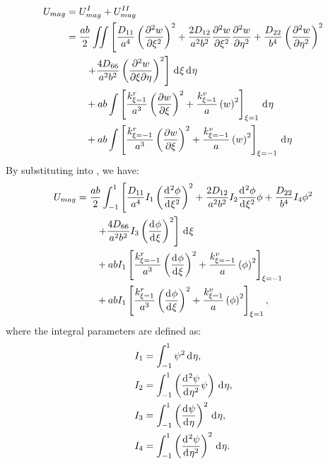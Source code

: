 \documentclass[preprint,12pt]{elsarticle}
\newcommand{\id}{\mathrm{d}\mkern1mu}
\begin{document}
%
\begin{equation}\label{eq:poten_energy_tolx}
	\begin{split}
		U_{mag} &= U^{I}_{mag} + U^{II}_{mag} \\
		&= \frac{ab}{2} \iint \left[ \frac{D_{11}}{a^4} \left( \frac{\partial^2 w}{\partial \xi^2} \right)^2 + \frac{2 D_{12}}{a^2 b^2} \frac{\partial^2 w}{\partial \xi^2} \frac{\partial^2 w}{\partial \eta^2} + \frac{D_{22}}{b^4} \left( \frac{\partial^2 w}{\partial \eta^2} \right)^2 \right. \\
		&\qquad \left.  + \frac{4 D_{66}}{a^2 b^2} \left( \frac{\partial^2 w}{\partial \xi \partial \eta} \right)^2 \right] \, \id\xi \, \id\eta \\
		&\qquad + ab \int \left[\frac{k^r_{\xi=1}}{a^3} \left( \frac{\partial w}{\partial \xi} \right)^2 + \frac{k^v_{\xi=1}}{a} \left( w \right)^2 \right]_{\xi=1} \, \id \eta \\
		&\qquad + ab \int \left[\frac{k^r_{\xi=-1}}{a^3} \left( \frac{\partial w}{\partial \xi} \right)^2 + \frac{k^v_{\xi=-1}}{a} \left( w \right)^2 \right]_{\xi=-1} \, \id \eta
	\end{split}
\end{equation}
%
By substituting  into , we have:
%
\begin{equation}\label{eq:poten_energy_tolx2}
	\begin{split}
		U_{mag}&=\frac{ab}{2} \int_{-1}^{1} \left[ \frac{D_{11}}{a^4}I_1 \left( \frac{\id^2\phi }{\id \xi^2} \right)^2 + \frac{2 D_{12}}{a^2 b^2}I_2 \frac{\id^2\phi }{\id \xi^2}\phi  + \frac{D_{22}}{b^4}I_4  \phi^2 \right. \\
		&\qquad \left. + \frac{4 D_{66}}{a^2 b^2}I_3 \left( \frac{\id \phi }{\id \xi}\right)^2 \right] \, \id\xi \\
		&\qquad + abI_1 \left[\frac{k^r_{\xi=-1}}{a^3} \left( \frac{\id \phi}{\id \xi} \right)^2+ \frac{k^v_{\xi=-1}}{a} \left( \phi \right)^2\right]_{\xi=-1}\\
		&\qquad + abI_1 \left[\frac{k^r_{\xi=1}}{a^3} \left( \frac{\id \phi}{\id \xi} \right)^2+ \frac{k^v_{\xi=1}}{a} \left( \phi \right)^2\right]_{\xi=1},
	\end{split}
\end{equation}
%
where the integral parameters are defined as:
%
\begin{equation}\label{eq:inte_phi_text}  
	\begin{split}  
		&I_1 = \int_{-1}^{1} \psi^2 \, \id\eta, \\  
		&I_2 = \int_{-1}^{1} \left( \frac{\id^2 \psi}{\id \eta^2} \psi \right) \, \id\eta, \\  
		&I_3 = \int_{-1}^{1} \left( \frac{\id \psi}{\id \eta} \right)^2 \, \id\eta, \\  
		&I_4 = \int_{-1}^{1} \left( \frac{\id^2 \psi}{\id \eta^2} \right)^2 \, \id\eta.  
	\end{split}  
\end{equation}   
\end{document}
